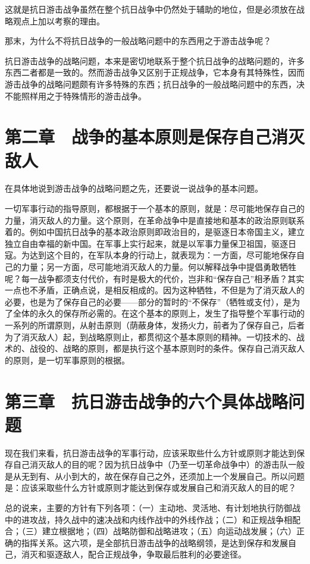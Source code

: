 这就是抗日游击战争虽然在整个抗日战争中仍然处于辅助的地位，但是必须放在战略观点上加以考察的理由。

那末，为什么不将抗日战争的一般战略问题中的东西用之于游击战争呢？

抗日游击战争的战略问题，本来是密切地联系于整个抗日战争的战略问题的，许多东西二者都是一致的。然而游击战争又区别于正规战争，它本身有其特殊性，因而游击战争的战略问题颇有许多特殊的东西；抗日战争的一般战略问题中的东西，决不能照样用之于特殊情形的游击战争。

\section{第二章　战争的基本原则是保存自己消灭敌人}

在具体地说到游击战争的战略问题之先，还要说一说战争的基本问题。

一切军事行动的指导原则，都根据于一个基本的原则，就是：尽可能地保存自己的力量，消灭敌人的力量。这个原则，在革命战争中是直接地和基本的政治原则联系着的。例如中国抗日战争的基本政治原则即政治目的，是驱逐日本帝国主义，建立独立自由幸福的新中国。在军事上实行起来，就是以军事力量保卫祖国，驱逐日寇。为达到这个目的，在军队本身的行动上，就表现为：一方面，尽可能地保存自己的力量；另一方面，尽可能地消灭敌人的力量。何以解释战争中提倡勇敢牺牲呢？每一战争都须支付代价，有时是极大的代价，岂非和“保存自己”相矛盾？其实一点也不矛盾，正确点说，是相反相成的。因为这种牺牲，不但是为了消灭敌人的必要，也是为了保存自己的必要——部分的暂时的“不保存”（牺牲或支付），是为了全体的永久的保存所必需的。在这个基本的原则上，发生了指导整个军事行动的一系列的所谓原则，从射击原则（荫蔽身体，发扬火力，前者为了保存自己，后者为了消灭敌人）起，到战略原则止，都贯彻这个基本原则的精神。一切技术的、战术的、战役的、战略的原则，都是执行这个基本原则时的条件。保存自己消灭敌人的原则，是一切军事原则的根据。

\section{第三章　抗日游击战争的六个具体战略问题}

现在我们来看，抗日游击战争的军事行动，应该采取些什么方针或原则才能达到保存自己消灭敌人的目的呢？因为抗日战争中（乃至一切革命战争中）的游击队一般是从无到有、从小到大的，故在保存自己之外，还须加上一个发展自己。所以问题是：应该采取些什么方针或原则才能达到保存或发展自己和消灭敌人的目的呢？

总的说来，主要的方针有下列各项：（一）主动地、灵活地、有计划地执行防御战中的进攻战，持久战中的速决战和内线作战中的外线作战；（二）和正规战争相配合；（三）建立根据地；（四）战略防御和战略进攻；（五）向运动战发展；（六）正确的指挥关系。这六项，是全部抗日游击战争的战略纲领，是达到保存和发展自己，消灭和驱逐敌人，配合正规战争，争取最后胜利的必要途径。

